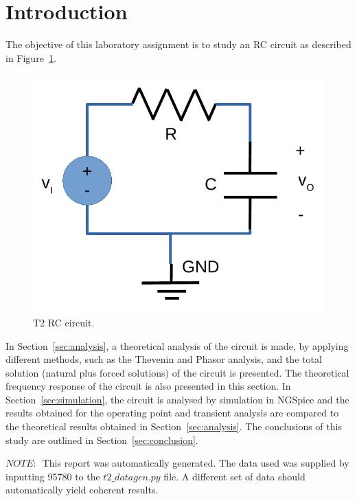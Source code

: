 \section{Introduction}
\label{sec:introduction}


\par The objective of this laboratory assignment is to study an RC circuit as described in Figure~\ref{fig:rc}.


\begin{figure}[h]
\centering
\includegraphics[width=0.9\linewidth]{../doc/rc.pdf}
\caption{T2 RC circuit.}
\label{fig:rc}
\end{figure}


\par In Section~\ref{sec:analysis}, a theoretical analysis of the circuit is made, by applying different methods, such as the Thevenin and Phasor analysis, and the total solution (natural plus forced solutions) of the circuit is presented. The theoretical frequency response of the circuit is also presented in this section. In Section~\ref{sec:simulation}, the circuit is analysed by simulation in NGSpice and the results obtained for the operating point and transient analysis are compared to the theoretical results obtained in Section~\ref{sec:analysis}. The conclusions of this study are outlined in Section~\ref{sec:conclusion}.

$NOTE:$~This report was automatically generated. The data used was supplied by inputting 95780 to the $t2\_datagen.py$ file. A different set of data should automatically yield coherent results.

